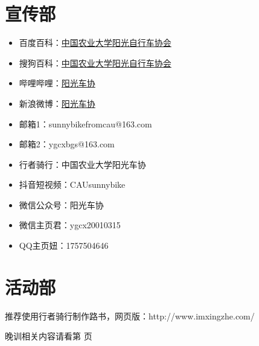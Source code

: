 \documentclass{ctexbook}
\begin{document}
\section{宣传部}
\begin{itemize}

\item 百度百科：\href{https://baike.baidu.com/item/%E4%B8%AD%E5%9B%BD%E5%86%9C%E4%B8%9A%E5%A4%A7%E5%AD%A6%E9%98%B3%E5%85%89%E8%87%AA%E8%A1%8C%E8%BD%A6%E5%8D%8F%E4%BC%9A/1861065?fr=aladdin}{中国农业大学阳光自行车协会}
\item 搜狗百科：\href{https://baike.sogou.com/v45363368.htm?fromTitle=%E4%B8%AD%E5%9B%BD%E5%86%9C%E4%B8%9A%E5%A4%A7%E5%AD%A6%E9%98%B3%E5%85%89%E8%87%AA%E8%A1%8C%E8%BD%A6%E5%8D%8F%E4%BC%9A}{中国农业大学阳光自行车协会}
\item 哔哩哔哩：\href{https://space.bilibili.com/266648273?from=search&seid=13669577487834144080}{阳光车协}
\item 新浪微博：\href{https://weibo.com/u/2026266875?is_all=1}{阳光车协}
\item 邮箱1：sunnybikefromcau@163.com
\item 邮箱2：ygcxbgs@163.com
\item 行者骑行：中国农业大学阳光车协
\item 抖音短视频：CAUsunnybike
\item 微信公众号：阳光车协
\item 微信主页君：ygcx20010315
\item QQ主页妞：1757504646
\end{itemize}
\section{活动部}
推荐使用行者骑行制作路书，网页版：http://www.imxingzhe.com/

晚训相关内容请看第 \pageref{sec:晚训} 页 
\end{document}
